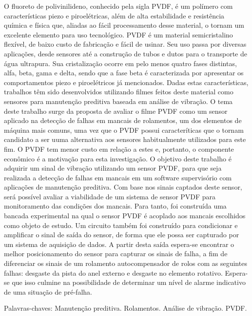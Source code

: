 \documentclass[
	12pt,				
	oneside,			
	a4paper,			
	english,			
	brazil,			
	]{abntex2ppgsi}
\begin{document}
\begin{resumo}



O fluoreto de polivinilideno, conhecido pela sigla PVDF, é um polímero com características piezo e piroelétricas, além de alta estabilidade e resistência química e física que, aliadas ao fácil processamento desse material, o tornam um excelente elemento para uso tecnológico. PVDF é um material semicristalino flexível, de baixo custo de fabricação e fácil de usinar. Seu uso passa por diversas aplicações, desde sensores até a construção de tubos e dutos para o transporte de água ultrapura. Sua cristalização ocorre em pelo menos quatro fases distintas, alfa, beta, gama e delta, sendo que a fase beta é caracterizada por apresentar os comportamentos piezo e piroelétricos já mencionados.
Dadas estas características, trabalhos têm sido desenvolvidos utilizando filmes feitos deste material como sensores para manutenção preditiva baseada em análise de vibração. O tema deste trabalho surge da proposta de avaliar o filme PVDF como um sensor aplicado na detecção de falhas em mancais de rolamentos, um dos elementos de máquina mais comuns, uma vez que o PVDF possui caracteríticas que o tornam candidato a ser uuma alternativa aos sensores habitualmente utilizados para este fim. O PVDF tem menor custo em relação a estes e, portanto, o componente econômico é a motivação para esta investigação.
O objetivo deste trabalho é adquirir um sinal de vibração utilizando um sensor PVDF, para que seja realizada a detecção de falhas em mancais em um software supervisório com aplicações de manutenção preditiva. Com base nos sinais captados deste sensor, será possível avaliar a viabilidade de um sistema de sensor PVDF para monitoramento das condições dos mancais. Para tanto, foi construída uma bancada experimental na qual o sensor PVDF é acoplado aos mancais escolhidos como objeto de estudo. Um circuito também foi construído para condicionar e amplificar o sinal de saída do sensor, de forma que ele possa ser capturado por um sistema de aquisição de dados. A partir desta saída espera-se encontrar o melhor posicionamento do sensor para capturar os sinais de falha, a fim de diferenciar os sinais de um rolamento autocompensador de rolos com as seguintes falhas: desgaste da pista do anel externo e desgaste no elemento rotativo. Espera-se que isso culmine na possibilidade de determinar um nível de alarme indicativo de uma situação de pré-falha.


Palavras-chaves: Manutenção preditiva. Rolamentos. Análise de vibração. PVDF.
\end{resumo}
\end{document}
